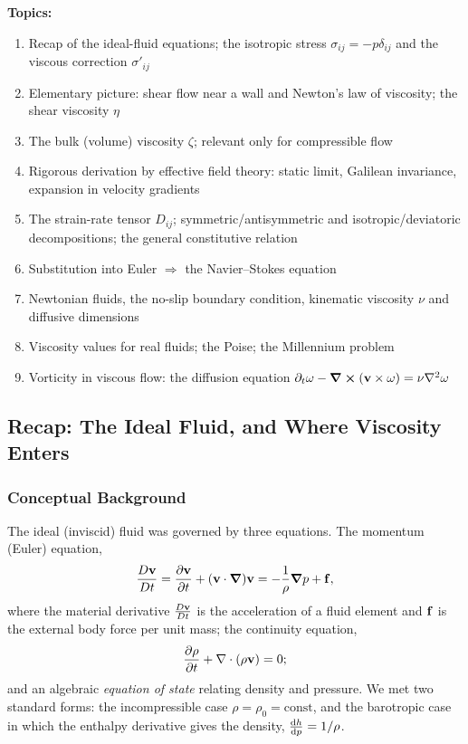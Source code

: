 \documentclass[../main.tex]{subfiles}
\begin{document}
\medskip\noindent\textbf{Topics:}
\begin{enumerate}
  \item Recap of the ideal-fluid equations; the isotropic stress $\sigma_{ij}=-p\delta_{ij}$ and the viscous correction $\sigma'_{ij}$
  \item Elementary picture: shear flow near a wall and Newton's law of viscosity; the shear viscosity $\eta$
  \item The bulk (volume) viscosity $\zeta$; relevant only for compressible flow
  \item Rigorous derivation by effective field theory: static limit, Galilean invariance, expansion in velocity gradients
  \item The strain-rate tensor $D_{ij}$; symmetric/antisymmetric and isotropic/deviatoric decompositions; the general constitutive relation
  \item Substitution into Euler $\Rightarrow$ the Navier--Stokes equation
  \item Newtonian fluids, the no-slip boundary condition, kinematic viscosity $\nu$ and diffusive dimensions
  \item Viscosity values for real fluids; the Poise; the Millennium problem
  \item Vorticity in viscous flow: the diffusion equation $\partial_t\mathbf{\omega}-\curl(\mathbf{v}\times\mathbf{\omega})=\nu\nabla^2\mathbf{\omega}$
\end{enumerate}

\subsection{Recap: The Ideal Fluid, and Where Viscosity Enters}\label{sec:lec18:recap}

\subsubsection*{Conceptual Background}
The ideal (inviscid) fluid was governed by three equations. The momentum (Euler) equation,
\begin{equation}
  \frac{D\mathbf{v}}{Dt} = \pdv{\mathbf{v}}{t} + (\mathbf{v}\cdot\grad)\mathbf{v} = -\frac{1}{\rho}\grad p + \mathbf{f},
  \label{eq:lec18_euler}
\end{equation}
where the material derivative $\frac{D\mathbf{v}}{Dt}$ is the acceleration of a fluid element and $\mathbf{f}$ is the external body force per unit mass; the continuity equation,
\begin{equation}
  \pdv{\rho}{t} + \nabla \cdot(\rho\mathbf{v}) = 0;
  \label{eq:lec18_continuity}
\end{equation}
and an algebraic \emph{equation of state} relating density and pressure. We met two standard forms: the incompressible case $\rho=\rho_0=\text{const}$, and the barotropic case in which the enthalpy derivative gives the density, $\dv{h}{p}=1/\rho$.
\end{document}

